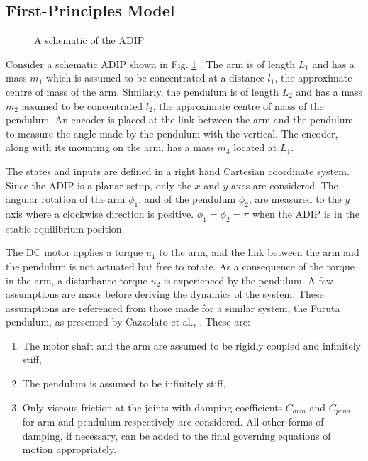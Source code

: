 \newpage
\subsection{First-Principles Model}
\label{Sec:firstprinci}
\begin{figure}[H]
	\centering
	    \scalebox{.5}{}
		\caption{A schematic of the ADIP}
		\label{fig:ADIP_model}
\end{figure}
Consider a schematic ADIP shown in Fig. \ref{fig:ADIP_model} . The arm is of length $L_1$ and has a mass $m_1$ which is assumed to be concentrated at a distance $l_1$, the approximate centre of mass of the arm. Similarly, the pendulum is of length $L_2$ and has a mass $m_2$ assumed to be concentrated $l_2$, the approximate centre of mass of the pendulum. An encoder is placed at the link between the arm and the pendulum to measure the angle made by the pendulum with the vertical. The encoder, along with its mounting on the arm, has a mass $m_3$ located at $L_1$.\par
The states and inputs are defined in a right hand Cartesian coordinate system. Since the ADIP is a planar setup, only the $x$ and $y$ axes are considered. The angular rotation of the arm $\phi_1$, and of the pendulum $\phi_2$, are measured to the $y$ axis where a clockwise direction is positive. $\phi_1 = \phi_2 = \pi$ when the ADIP is in the stable equilibrium position.\par
The DC motor applies a torque $u_1$ to the arm, and the link between the arm and the pendulum is not actuated but free to rotate. As a consequence of the torque in the arm, a disturbance torque $u_2$ is experienced by the pendulum.
A few assumptions are made before deriving the dynamics of the system. These assumptions are referenced from those made for a similar system, the Furuta pendulum, as presented by Cazzolato et al., \cite{Cazzolato}. These are:
\begin{enumerate}
    \item The motor shaft and the arm are assumed to be rigidly coupled and infinitely stiff,
    \item The pendulum is assumed to be infinitely stiff,
    \item Only viscous friction at the joints with damping coefficients $C_{arm}$ and $C_{pend}$ for arm and pendulum respectively are considered. All other forms of damping, if necessary, can be added to the final governing equations of motion appropriately.  
\end{enumerate}
